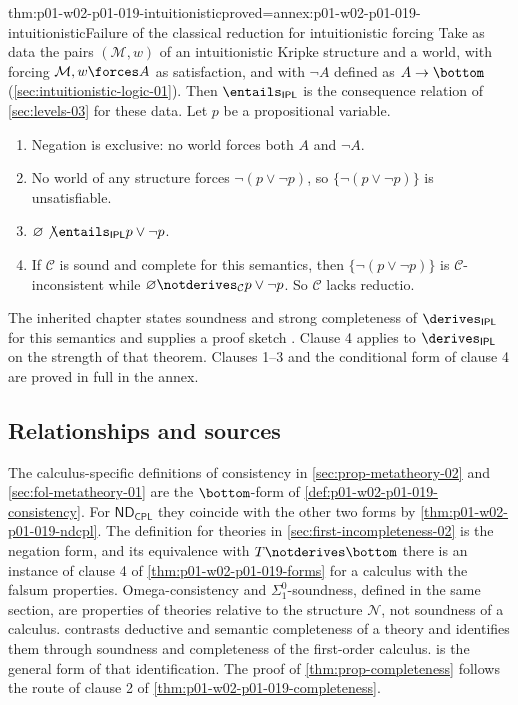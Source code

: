 \begin{hbtheorem}{thm:p01-w02-p01-019-intuitionistic}{proved=annex:p01-w02-p01-019-intuitionistic}{Failure of the classical reduction for intuitionistic forcing}
Take as data the pairs \((\mathcal M,w)\) of an intuitionistic Kripke
structure and a world, with forcing \(\mathcal M,w\forces A\) as
satisfaction, and with \(\neg A\) defined as \(A\to\bottom\)
(\cref{sec:intuitionistic-logic-01}). Then
\(\entails_{\mathsf{IPL}}\) is the consequence relation of
\cref{sec:levels-03} for these data. Let \(p\) be a propositional variable.
\begin{enumerate}
  \item Negation is exclusive: no world forces both \(A\) and \(\neg A\).
  \item No world of any structure forces \(\neg(p\lor\neg p)\), so
        \(\{\neg(p\lor\neg p)\}\) is unsatisfiable.
  \item \(\varnothing\not\entails_{\mathsf{IPL}}p\lor\neg p\).
  \item If \(\mathcal C\) is sound and complete for this semantics, then
        \(\{\neg(p\lor\neg p)\}\) is \(\mathcal C\)-inconsistent while
        \(\varnothing\notderives_{\mathcal C}p\lor\neg p\). So \(\mathcal C\)
        lacks reductio.
\end{enumerate}
\end{hbtheorem}

The inherited chapter states soundness and strong completeness of
\(\derives_{\mathsf{IPL}}\) for this semantics and supplies a proof sketch
\cite[ch.~``Intuitionistic Logic'', theorem ``Soundness and strong
completeness of \(\mathsf{IPL}\)'']{FrozenFormalLogicConsistencyComparison}.
Clause 4 applies to \(\derives_{\mathsf{IPL}}\) on the strength of that
theorem. Clauses 1--3 and the conditional form of clause 4 are proved in full
in the annex.

\subsection{Relationships and sources}
\label{sec:p01-w02-p01-019-sources}

The calculus-specific definitions of consistency in
\cref{sec:prop-metatheory-02} and \cref{sec:fol-metatheory-01} are the
\(\bottom\)-form of \cref{def:p01-w02-p01-019-consistency}. For
\(\mathsf{ND}_{\mathsf{CPL}}\) they coincide with the other two forms by
\cref{thm:p01-w02-p01-019-ndcpl}. The definition for theories in
\cref{sec:first-incompleteness-02} is the negation form, and its
equivalence with \(T\notderives\bottom\) there is an instance of clause 4 of
\cref{thm:p01-w02-p01-019-forms} for a calculus with the falsum properties. Omega-consistency
and \(\Sigma^0_1\)-soundness, defined in the same section, are properties of
theories relative to the structure \(\mathcal N\), not soundness of a calculus.
 contrasts deductive and semantic completeness
of a theory and identifies them through soundness and completeness of the
first-order calculus.  is the general form
of that identification. The proof of \cref{thm:prop-completeness} follows the
route of clause 2 of \cref{thm:p01-w02-p01-019-completeness}.

